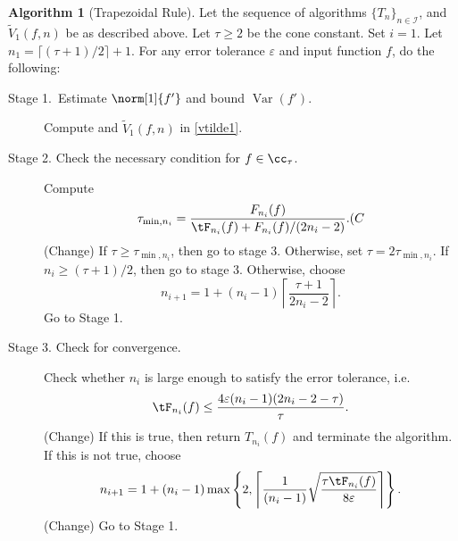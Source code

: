 \documentclass{iitthesis}
\DeclareMathOperator{\Var}{Var}
\theoremstyle{definition}
\newtheorem{algo}{Algorithm}
\theoremstyle{remark}
\begin{document}
\begin{algo}[Trapezoidal Rule] \label{multistagetrapalgo}
Let the sequence of algorithms $\{T_n\}_{n\in \mathcal{I}}$, %
and $\widetilde{V}_1(f,n)$ be as described above.
Let $\tau\ge2$ be the cone constant. Set $i=1$. Let $n_1=\lceil(\tau+1)/2\rceil+1$. For any error tolerance $\varepsilon$ and input function $f$, do the following:
\begin{description}
\item[Stage 1.\ Estimate {$\norm[1]{f'}$} and bound {$\Var(f')$}.] Compute  and $\widetilde{V}_1(f,n)$ in \eqref{vtilde1}.

\item[Stage 2. Check the necessary condition for $f \in \cc_{\tau}$.] Compute
    \begin{align*}
     \tau_{\min,n_i} =  \frac{F_{n_i}(f)}{\tF_{n_i}(f)+F_{n_i}(f)/(2n_i-2)}. (C
    \end{align*}
    (Change)
If $\tau \ge \tau_{\min,n_i}$, then go to stage 3.  Otherwise, set $\tau = 2\tau_{\min,n_i}$.  If $n_i \ge (\tau+1)/2$, then go to stage 3.  Otherwise, choose
$$n_{i+1}=1+ (n_i-1)\left\lceil\frac{\tau+1}{2n_i-2}\right\rceil.$$
Go to Stage 1.

\item[Stage 3. Check for convergence.] Check whether $n_i$ is large enough to satisfy the error tolerance, i.e.
    \begin{equation*}
     \tF_{n_i}(f) \le \frac{4\varepsilon(n_i-1)(2n_i-2 - \tau)}{\tau}.
    \end{equation*}
    (Change)
If this is true, then return $T_{n_i}(f)$ and terminate the algorithm.   If this is not true, choose
$$
n_{i+1}=1+ (n_i-1)\max\left\{2,\left\lceil\frac{1}{(n_i-1)}\sqrt{\frac{\tau \tF_{n_i}(f)}{8\varepsilon}}\right\rceil\right\}.
$$
(Change)
Go to Stage 1.
\end{description}
\end{algo}
\end{document}
